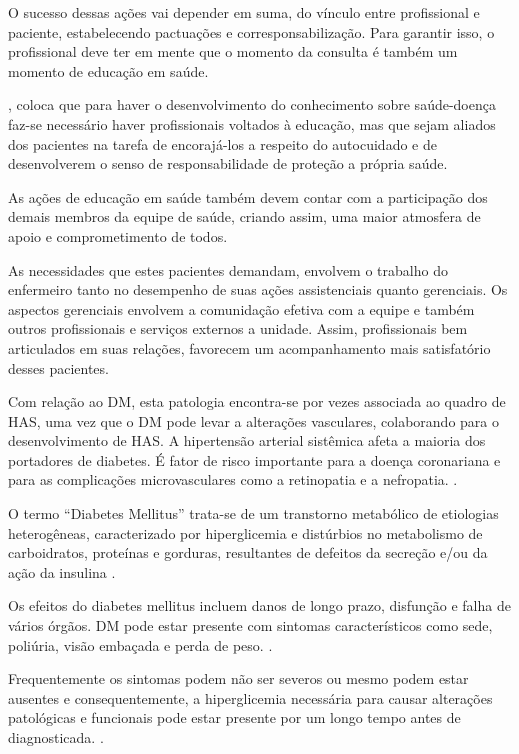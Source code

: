 O sucesso dessas ações vai depender em suma, do vínculo entre profissional e paciente, estabelecendo pactuações e corresponsabilização. Para garantir isso, o profissional deve ter em mente que o momento da consulta é também um momento de educação em saúde.

\cite{santos2012adesao}, coloca que para haver o desenvolvimento do conhecimento sobre saúde-doença faz-se necessário haver profissionais voltados à educação, mas que sejam aliados dos pacientes na tarefa de encorajá-los a respeito do autocuidado e de desenvolverem o senso de responsabilidade de proteção a própria saúde. 

As ações de educação em saúde também devem contar com a participação dos demais membros da equipe de saúde, criando assim, uma maior atmosfera de apoio e comprometimento de todos. 

As necessidades que estes pacientes demandam, envolvem o trabalho do enfermeiro tanto no desempenho de suas ações assistenciais quanto gerenciais. Os aspectos gerenciais envolvem a comunidação efetiva com a equipe e também outros profissionais e serviços externos a unidade. Assim, profissionais bem articulados em suas relações, favorecem um acompanhamento mais satisfatório desses pacientes. 

Com relação ao \acrlong{DM}, esta patologia encontra-se por vezes associada ao quadro de HAS, uma vez que o DM pode levar a alterações vasculares, colaborando para o desenvolvimento de HAS. A hipertensão arterial sistêmica afeta a maioria dos portadores de diabetes. É fator de risco importante para a doença coronariana e para as complicações microvasculares como a retinopatia e a nefropatia. \cite{atencaobasica16}.

O termo ``Diabetes Mellitus'' trata-se de um transtorno metabólico de etiologias heterogêneas, caracterizado por hiperglicemia e distúrbios no metabolismo de carboidratos, proteínas e gorduras, resultantes de defeitos da secreção e/ou da ação da insulina \cite{assal1999definition}.

Os efeitos do diabetes mellitus incluem danos de longo prazo, disfunção e falha de vários órgãos. DM pode estar presente com sintomas característicos como sede, poliúria, visão embaçada e perda de peso. \cite{assal1999definition}.

Frequentemente os sintomas podem não ser severos ou mesmo podem estar ausentes e consequentemente, a hiperglicemia  necessária para causar alterações patológicas e funcionais pode estar presente por um longo tempo antes de diagnosticada. \cite{assal1999definition}.


